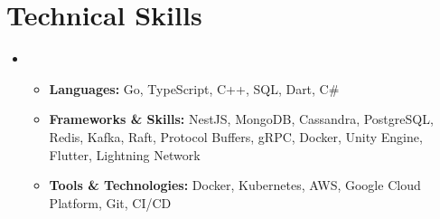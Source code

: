 \documentclass[letterpaper,11pt]{article}
\newcommand{\resumeKVItem}[2]{\item\small{\textbf{#1:} #2}}
\newcommand{\resumeSubHeadingListStart}{\begin{itemize}[leftmargin=0.0in, label={}]}
\newcommand{\resumeSubHeadingListEnd}{\end{itemize}}
\newcommand{\resumeItemListStart}{\begin{itemize}}
\newcommand{\resumeItemListEnd}{\end{itemize}\vspace{-4pt}}
\begin{document}
\section{Technical Skills}
\resumeSubHeadingListStart
    \item
    \resumeItemListStart
        \resumeKVItem{Languages}{Go, TypeScript, C++, SQL, Dart, C\#}
        \resumeKVItem{Frameworks \& Skills}{NestJS, MongoDB, Cassandra, PostgreSQL, Redis, Kafka, Raft, Protocol Buffers, gRPC, Docker, Unity Engine, Flutter, Lightning Network}
        \resumeKVItem{Tools \& Technologies}{Docker, Kubernetes, AWS, Google Cloud Platform, Git, CI/CD}
    \resumeItemListEnd
\resumeSubHeadingListEnd
\end{document}
